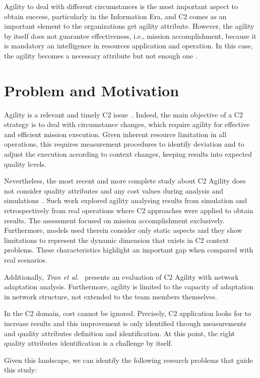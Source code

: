 Agility to deal with different circumstances is the most important aspect to obtain success, particularly in the Information Era, and C2 comes as an important element to the organizations get agility attribute. However, the agility by itself does not guarantee effectiveness, i.e., mission accomplishment, because it is mandatory an intelligence in resources application and operation. In this case, the agility becomes a necessary attribute but not enough one \cite{Power01}.


\section{Problem and Motivation} \label{sec:problemMotivation}

Agility is a relevant and timely C2 issue~\cite{FRANCE2014,c2-02}. Indeed, the main objective of a C2 strategy is to deal with circumstance changes, which require agility for effective and efficient mission execution. 
Given inherent resource limitation in all operations, this requires measurement procedures to identify deviation and to adjust the execution according to context changes, keeping results into expected quality levels. 

Nevertheless, the most recent and more complete study about C2 Agility does not consider quality attributes and any cost values during analysis and simulations~\cite{FRANCE2014}. Such work explored  agility analysing results from simulation and retrospectively from real operations where C2 approaches were applied to obtain results. The assessment focused on mission accomplishment exclusively. Furthermore, models used therein consider only static aspects and they show limitations to represent the dynamic dimension that exists in C2 context problems. These characteristics highlight an important gap when compared with real scenarios. 

Additionally, \textit{Tran et al.}~\cite{c2-02} presents an evaluation of C2 Agility with network adaptation analysis. Furthermore, agility is limited to the capacity of adaptation in network structure, not extended to the team members themselves.

In the C2 domain, cost cannot be ignored. Precisely, C2 application looks for to increase results and this improvement is only identified through measurements and quality attributes definition and identification. At this point, the right quality attributes identification is a challenge by itself.

Given this landscape, we can identify the following research problems that guide this study:

